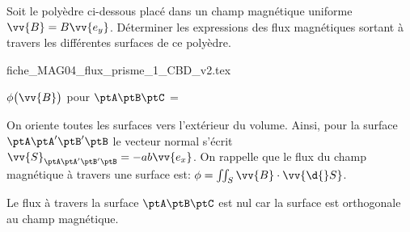 \finEntrainement











\hauteurLargeurCadreReponse		{8mm}{2.5cm}
\typeEntrainement				{} %
\initialisationEntrainement


Soit le polyèdre ci-dessous placé dans un champ magnétique uniforme $\vv{B} = B\vv{e_y}$.
Déterminer les expressions des flux magnétiques sortant à travers les différentes surfaces de ce polyèdre.

\minusSmallskip

\begin{center}
{fiche_MAG04_flux_prisme_1_CBD_v2.tex}
\end{center}

\minusBigskip


\debutEntrainement


\begin{enonce}
$\phi \big(\vv{B} \big)$ pour $\ptA\ptB\ptC$ =
\end{enonce}
%
\begin{corrige}
On oriente toutes les surfaces vers l'extérieur du volume. Ainsi, pour la surface $\ptA\ptA'\ptB'\ptB$ le vecteur normal s'écrit $\vv{S}_{\ptA\ptA'\ptB'\ptB}=-ab\vv{e_{x}}$.
On rappelle que le flux du champ magnétique à travers une surface est: $\phi=\iint_{S}\vv{B}\cdot\vv{\d{}S}$.

Le flux à travers la surface $\ptA\ptB\ptC$ est nul car la surface est orthogonale au champ magnétique.
\end{corrige}

